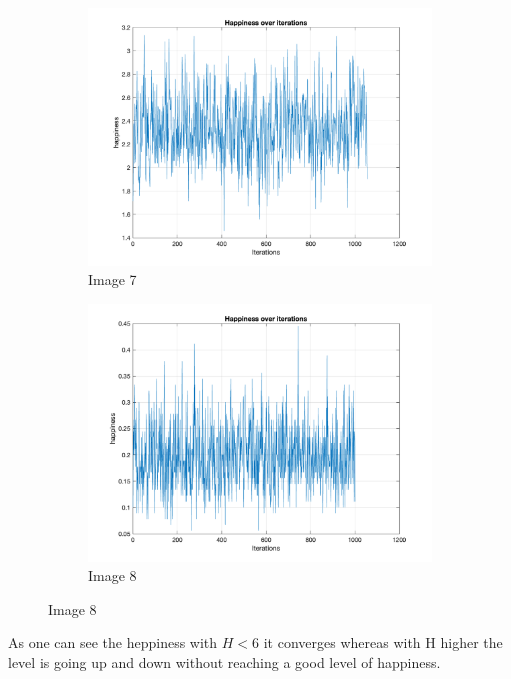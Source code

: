 \documentclass[unicode,11pt,a4paper,oneside,numbers=endperiod,openany]{scrartcl}
\begin{document}
\begin{figure}[H]
\begin{subfigure}[b]{0.4\textwidth}
        \includegraphics[width=\textwidth]{Convergence/ConvergenceH7Random_1.png}
        \caption{Image 7}
        \label{fig:image7}
      \end{subfigure}
      \begin{subfigure}[b]{0.4\textwidth}
        \includegraphics[width=\textwidth]{Convergence/ConvergenceH8Random_1.png}
        \caption{Image 8}
        \label{fig:image8}
      \end{subfigure}
      
      
\end{figure}
As one can see the heppiness with $H<6$ it converges whereas with H higher the level is going up and down without reaching a good level of happiness. \\
\end{document}
